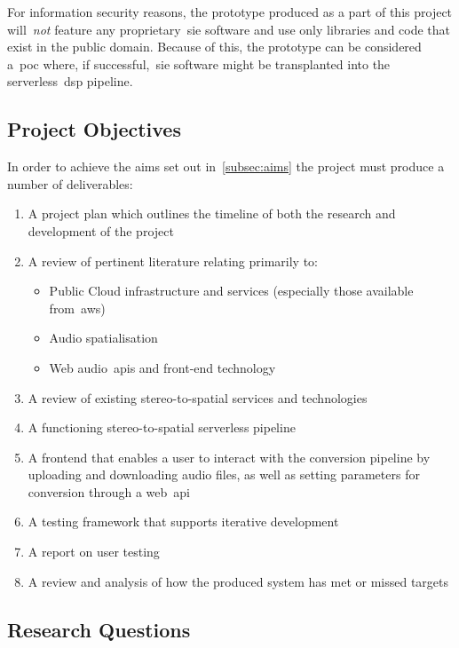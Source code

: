 For information security reasons, the prototype produced as a part of this project will~\textit{not} feature any proprietary~\gls{sie} software and use only libraries and code that exist in the public domain.
Because of this, the prototype can be considered a~\gls{poc} where, if successful,~\gls{sie} software might be transplanted into the serverless~\gls{dsp} pipeline.

\subsection{Project Objectives}\label{subsec:project-objectives}

In order to achieve the aims set out in~\ref{subsec:aims} the project must produce a number of deliverables:

\begin{enumerate}
    \item A project plan which outlines the timeline of both the research and development of the project
    \item A review of pertinent literature relating primarily to:
    \begin{itemize}
        \item Public Cloud infrastructure and services (especially those available from~\gls{aws})
        \item Audio spatialisation
        \item Web audio~\glspl{api} and front-end technology
    \end{itemize}
    \item A review of existing stereo-to-spatial services and technologies
    \item A functioning stereo-to-spatial serverless pipeline
    \item A frontend that enables a user to interact with the conversion pipeline by uploading and downloading audio files, as well as setting parameters for conversion through a web~\gls{api}
    \item A testing framework that supports iterative development
    \item A report on user testing
    \item A review and analysis of how the produced system has met or missed targets
\end{enumerate}

\subsection{Research Questions}\label{subsec:research-questions}

